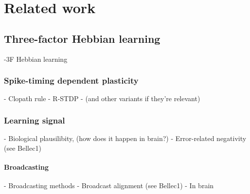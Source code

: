 \chapter{Related work}\label{ch:relatedwork}

\section{Three-factor Hebbian learning}
    \begin{tcolorbox}[colback=orange]
    -3F Hebbian learning
    \vspace{6cm}
    \end{tcolorbox}

    \subsection{Spike-timing dependent plasticity}
        \begin{tcolorbox}[colback=orange]
        - Clopath rule
        - R-STDP
        - (and other variants if they're relevant)

        \vspace{10cm}

        \end{tcolorbox}


    \subsection{Learning signal}
        \begin{tcolorbox}[colback=orange]
        - Biological plausilibity, (how does it happen in brain?)
        - Error-related negativity (see Bellec1)
        \vspace{10cm}

        \end{tcolorbox}

        \subsubsection{Broadcasting}

            \begin{tcolorbox}[colback=orange]
            - Broadcasting methods
              - Broadcast alignment (see Bellec1)
              - In brain
            \vspace{6cm}

            \end{tcolorbox}


